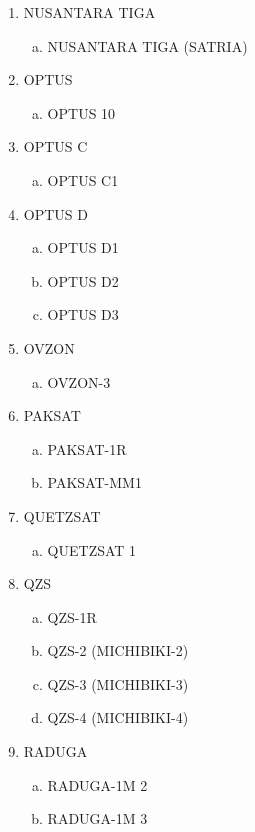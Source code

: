 \begin{multicols}{2}
\begin{enumerate}
  \item NUSANTARA TIGA
  \begin{enumerate}[a.]
    \item NUSANTARA TIGA (SATRIA)
  \end{enumerate}
  \item OPTUS
  \begin{enumerate}[a.]
    \item OPTUS 10
  \end{enumerate}
  \item OPTUS C
  \begin{enumerate}[a.]
    \item OPTUS C1
  \end{enumerate}
  \item OPTUS D
  \begin{enumerate}[a.]
    \item OPTUS D1
    \item OPTUS D2
    \item OPTUS D3
  \end{enumerate}
  \item OVZON
  \begin{enumerate}[a.]
    \item OVZON-3
  \end{enumerate}
  \item PAKSAT
  \begin{enumerate}[a.]
    \item PAKSAT-1R
    \item PAKSAT-MM1
  \end{enumerate}
  \item QUETZSAT
  \begin{enumerate}[a.]
    \item QUETZSAT 1
  \end{enumerate}
  \item QZS
  \begin{enumerate}[a.]
    \item QZS-1R
    \item QZS-2 (MICHIBIKI-2)
    \item QZS-3 (MICHIBIKI-3)
    \item QZS-4 (MICHIBIKI-4)
  \end{enumerate}
  \item RADUGA
  \begin{enumerate}[a.]
    \item RADUGA-1M 2
    \item RADUGA-1M 3
  \end{enumerate}

\end{enumerate}
\end{multicols}
